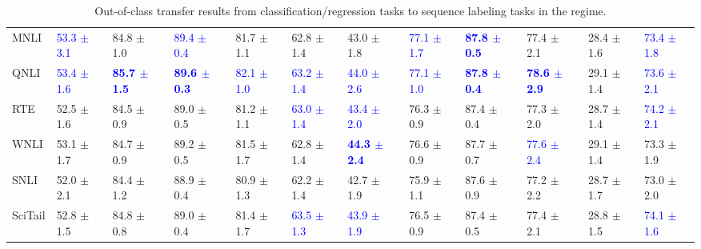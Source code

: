 \begin{landscape}
\begin{table}[t]
\begin{adjustbox}{max width=2\textwidth}
\begin{tabular}{ l l l l l  l l l l  l l l }
MNLI & \textcolor{blue}{53.3 $\pm$ 3.1} & 84.8 $\pm$ 1.0 & \textcolor{blue}{89.4 $\pm$ 0.4} & 81.7 $\pm$ 1.1 & 62.8 $\pm$ 1.4 & 43.0 $\pm$ 1.8 & \textcolor{blue}{77.1 $\pm$ 1.7} & \textbf{\textcolor{blue}{87.8 $\pm$ 0.5}} & 77.4 $\pm$ 2.1 & 28.4 $\pm$ 1.6 & \textcolor{blue}{73.4 $\pm$ 1.8}\\
QNLI & \textcolor{blue}{53.4 $\pm$ 1.6} & \textbf{\textcolor{blue}{85.7 $\pm$ 1.5}} & \textbf{\textcolor{blue}{89.6 $\pm$ 0.3}} & \textcolor{blue}{82.1 $\pm$ 1.0} & \textcolor{blue}{63.2 $\pm$ 1.4} & \textcolor{blue}{44.0 $\pm$ 2.6} & \textcolor{blue}{77.1 $\pm$ 1.0} & \textbf{\textcolor{blue}{87.8 $\pm$ 0.4}} & \textbf{\textcolor{blue}{78.6 $\pm$ 2.9}} & 29.1 $\pm$ 1.4 & \textcolor{blue}{73.6 $\pm$ 2.1}\\
RTE & 52.5 $\pm$ 1.6 & 84.5 $\pm$ 0.9 & 89.0 $\pm$ 0.5 & 81.2 $\pm$ 1.1 & \textcolor{blue}{63.0 $\pm$ 1.4} & \textcolor{blue}{43.4 $\pm$ 2.0} & 76.3 $\pm$ 0.9 & 87.4 $\pm$ 0.4 & 77.3 $\pm$ 2.0 & 28.7 $\pm$ 1.4 & \textcolor{blue}{74.2 $\pm$ 2.1}\\
WNLI & 53.1 $\pm$ 1.7 & 84.7 $\pm$ 0.9 & 89.2 $\pm$ 0.5 & 81.5 $\pm$ 1.7 & 62.8 $\pm$ 1.4 & \textbf{\textcolor{blue}{44.3 $\pm$ 2.4}} & 76.6 $\pm$ 0.9 & 87.7 $\pm$ 0.7 & \textcolor{blue}{77.6 $\pm$ 2.4} & 29.1 $\pm$ 1.4 & 73.3 $\pm$ 1.9\\
SNLI & 52.0 $\pm$ 2.1 & 84.4 $\pm$ 1.2 & 88.9 $\pm$ 0.4 & 80.9 $\pm$ 1.3 & 62.2 $\pm$ 1.4 & 42.7 $\pm$ 1.9 & 75.9 $\pm$ 1.1 & 87.6 $\pm$ 0.9 & 77.2 $\pm$ 2.2 & 28.7 $\pm$ 1.7 & 73.0 $\pm$ 2.0\\
SciTail & 52.8 $\pm$ 1.5 & 84.8 $\pm$ 0.8 & 89.0 $\pm$ 0.4 & 81.4 $\pm$ 1.7 & \textcolor{blue}{63.5 $\pm$ 1.3} & \textcolor{blue}{43.9 $\pm$ 1.9} & 76.5 $\pm$ 0.9 & 87.4 $\pm$ 0.5 & 77.4 $\pm$ 2.1 & 28.8 $\pm$ 1.5 & \textcolor{blue}{74.1 $\pm$ 1.6}\\
\bottomrule
\end{tabular}
\end{adjustbox}
\caption{Out-of-class transfer results from classification/regression tasks to sequence labeling tasks in the  regime.}
\label{tbla11c}
\end{table}
\end{landscape}